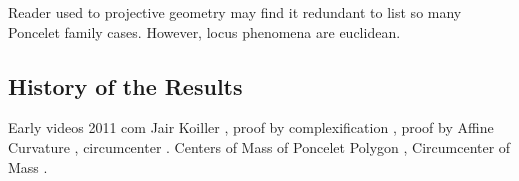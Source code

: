
Reader used to projective geometry may find it redundant to list so many Poncelet family cases. However, locus phenomena are euclidean.

\subsection*{History of the Results}

Early videos 2011 com Jair Koiller \cite{dsr_vid11incenter,dsr_vid11e}, proof by complexification \cite{olga14}, proof by Affine Curvature \cite{garcia2019-incenter}, circumcenter \cite{corentin2021-circum}. Centers of Mass of Poncelet Polygon \cite{schwartz2016-com}, Circumcenter of Mass \cite{sergei2014-circumcenter-of-mass}.